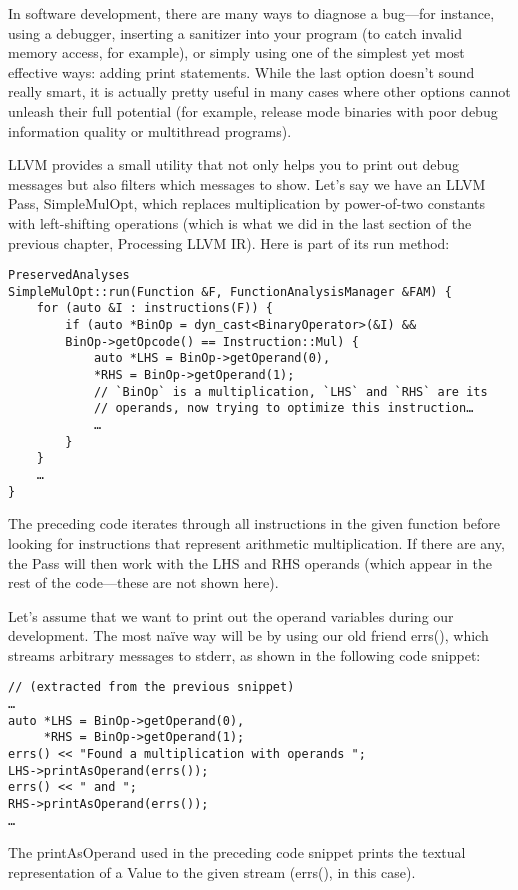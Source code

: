 In software development, there are many ways to diagnose a bug—for instance, using a debugger, inserting a sanitizer into your program (to catch invalid memory access, for example), or simply using one of the simplest yet most effective ways: adding print statements. While the last option doesn't sound really smart, it is actually pretty useful in many cases where other options cannot unleash their full potential (for example, release mode binaries with poor debug information quality or multithread programs).

LLVM provides a small utility that not only helps you to print out debug messages but also filters which messages to show. Let's say we have an LLVM Pass, SimpleMulOpt, which replaces multiplication by power-of-two constants with left-shifting operations (which is what we did in the last section of the previous chapter, Processing LLVM IR). Here is part of its run method:

\begin{lstlisting}[style=styleCXX]
PreservedAnalyses
SimpleMulOpt::run(Function &F, FunctionAnalysisManager &FAM) {
	for (auto &I : instructions(F)) {
		if (auto *BinOp = dyn_cast<BinaryOperator>(&I) &&
		BinOp->getOpcode() == Instruction::Mul) {
			auto *LHS = BinOp->getOperand(0),
			*RHS = BinOp->getOperand(1);
			// `BinOp` is a multiplication, `LHS` and `RHS` are its
			// operands, now trying to optimize this instruction…
			…
		}
	}
	…
}
\end{lstlisting}

The preceding code iterates through all instructions in the given function before looking for instructions that represent arithmetic multiplication. If there are any, the Pass will then work with the LHS and RHS operands (which appear in the rest of the code—these are not shown here).

Let's assume that we want to print out the operand variables during our development. The most naïve way will be by using our old friend errs(), which streams arbitrary messages to stderr, as shown in the following code snippet:

\begin{lstlisting}[style=styleCXX]
// (extracted from the previous snippet)
…
auto *LHS = BinOp->getOperand(0),
     *RHS = BinOp->getOperand(1);
errs() << "Found a multiplication with operands ";
LHS->printAsOperand(errs());
errs() << " and ";
RHS->printAsOperand(errs());
…
\end{lstlisting}

The printAsOperand used in the preceding code snippet prints the textual representation of a Value to the given stream (errs(), in this case).

